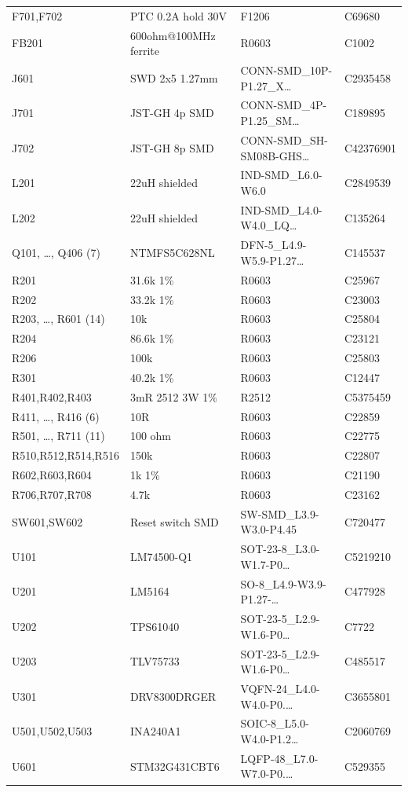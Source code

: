 \documentclass[11pt,a4paper]{article}
\begin{document}
{\begin{longtable}{p{3.6cm}p{4.6cm}p{3.8cm}l}
F701,F702 & PTC 0.2A hold 30V & F1206 & C69680 \\
FB201 & 600ohm@100MHz ferrite & R0603 & C1002 \\
J601 & SWD 2x5 1.27mm & CONN-SMD\_10P-P1.27\_X\ldots & C2935458 \\
J701 & JST-GH 4p SMD & CONN-SMD\_4P-P1.25\_SM\ldots & C189895 \\
J702 & JST-GH 8p SMD & CONN-SMD\_SH-SM08B-GHS\ldots & C42376901 \\
L201 & 22uH shielded & IND-SMD\_L6.0-W6.0 & C2849539 \\
L202 & 22uH shielded & IND-SMD\_L4.0-W4.0\_LQ\ldots & C135264 \\
Q101, \ldots, Q406 (7) & NTMFS5C628NL & DFN-5\_L4.9-W5.9-P1.27\ldots & C145537 \\
R201 & 31.6k 1\% & R0603 & C25967 \\
R202 & 33.2k 1\% & R0603 & C23003 \\
R203, \ldots, R601 (14) & 10k & R0603 & C25804 \\
R204 & 86.6k 1\% & R0603 & C23121 \\
R206 & 100k & R0603 & C25803 \\
R301 & 40.2k 1\% & R0603 & C12447 \\
R401,R402,R403 & 3mR 2512 3W 1\% & R2512 & C5375459 \\
R411, \ldots, R416 (6) & 10R & R0603 & C22859 \\
R501, \ldots, R711 (11) & 100 ohm & R0603 & C22775 \\
R510,R512,R514,R516 & 150k & R0603 & C22807 \\
R602,R603,R604 & 1k 1\% & R0603 & C21190 \\
R706,R707,R708 & 4.7k & R0603 & C23162 \\
SW601,SW602 & Reset switch SMD & SW-SMD\_L3.9-W3.0-P4.45 & C720477 \\
U101 & LM74500-Q1 & SOT-23-8\_L3.0-W1.7-P0\ldots & C5219210 \\
U201 & LM5164 & SO-8\_L4.9-W3.9-P1.27-\ldots & C477928 \\
U202 & TPS61040 & SOT-23-5\_L2.9-W1.6-P0\ldots & C7722 \\
U203 & TLV75733 & SOT-23-5\_L2.9-W1.6-P0\ldots & C485517 \\
U301 & DRV8300DRGER & VQFN-24\_L4.0-W4.0-P0.\ldots & C3655801 \\
U501,U502,U503 & INA240A1 & SOIC-8\_L5.0-W4.0-P1.2\ldots & C2060769 \\
U601 & STM32G431CBT6 & LQFP-48\_L7.0-W7.0-P0.\ldots & C529355 \\
\bottomrule
\end{longtable}
}

\end{document}

